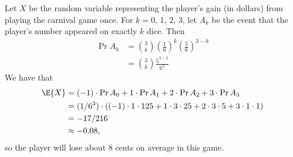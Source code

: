 Let $X$ be the random variable representing the player's gain (in dollars) from playing the carnival game once.
For $k=0$, 1, 2, 3, let $A_k$ be the event that the player's number appeared on exactly $k$ dice.
Then
\begin{align*}
    \Pr{A_k} &= \binom{3}{k}\left(\frac{1}{6}\right)^k\left(\frac{5}{6}\right)^{3-k} \\
    &= \binom{3}{k}\frac{5^{3-k}}{6^3}
\end{align*}
We have that
\begin{align*}
    \E{X} &= (-1)\cdot\Pr{A_0}+1\cdot\Pr{A_1}+2\cdot\Pr{A_2}+3\cdot\Pr{A_3} \\
    &= (1/6^3)\cdot((-1)\cdot1\cdot125+1\cdot3\cdot25+2\cdot3\cdot5+3\cdot1\cdot1) \\
    &= -17/216 \\
    &\approx -0.08,
\end{align*}
so the player will lose about 8 cents on average in this game.

